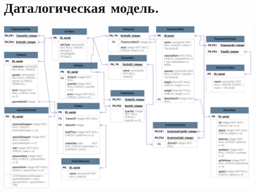 \documentclass[12pt,onecolumn]{article}
\begin{document}
\section{Даталогическая модель.}
\includegraphics[width=\textwidth]{image/datalogical-model.png}
\end{document}
